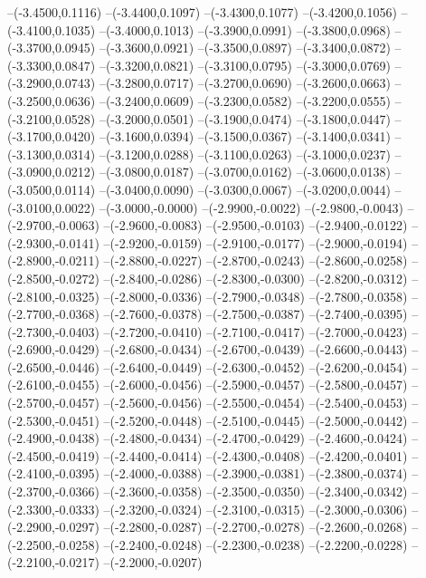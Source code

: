 	--(-3.4500,0.1116)
	--(-3.4400,0.1097)
	--(-3.4300,0.1077)
	--(-3.4200,0.1056)
	--(-3.4100,0.1035)
	--(-3.4000,0.1013)
	--(-3.3900,0.0991)
	--(-3.3800,0.0968)
	--(-3.3700,0.0945)
	--(-3.3600,0.0921)
	--(-3.3500,0.0897)
	--(-3.3400,0.0872)
	--(-3.3300,0.0847)
	--(-3.3200,0.0821)
	--(-3.3100,0.0795)
	--(-3.3000,0.0769)
	--(-3.2900,0.0743)
	--(-3.2800,0.0717)
	--(-3.2700,0.0690)
	--(-3.2600,0.0663)
	--(-3.2500,0.0636)
	--(-3.2400,0.0609)
	--(-3.2300,0.0582)
	--(-3.2200,0.0555)
	--(-3.2100,0.0528)
	--(-3.2000,0.0501)
	--(-3.1900,0.0474)
	--(-3.1800,0.0447)
	--(-3.1700,0.0420)
	--(-3.1600,0.0394)
	--(-3.1500,0.0367)
	--(-3.1400,0.0341)
	--(-3.1300,0.0314)
	--(-3.1200,0.0288)
	--(-3.1100,0.0263)
	--(-3.1000,0.0237)
	--(-3.0900,0.0212)
	--(-3.0800,0.0187)
	--(-3.0700,0.0162)
	--(-3.0600,0.0138)
	--(-3.0500,0.0114)
	--(-3.0400,0.0090)
	--(-3.0300,0.0067)
	--(-3.0200,0.0044)
	--(-3.0100,0.0022)
	--(-3.0000,-0.0000)
	--(-2.9900,-0.0022)
	--(-2.9800,-0.0043)
	--(-2.9700,-0.0063)
	--(-2.9600,-0.0083)
	--(-2.9500,-0.0103)
	--(-2.9400,-0.0122)
	--(-2.9300,-0.0141)
	--(-2.9200,-0.0159)
	--(-2.9100,-0.0177)
	--(-2.9000,-0.0194)
	--(-2.8900,-0.0211)
	--(-2.8800,-0.0227)
	--(-2.8700,-0.0243)
	--(-2.8600,-0.0258)
	--(-2.8500,-0.0272)
	--(-2.8400,-0.0286)
	--(-2.8300,-0.0300)
	--(-2.8200,-0.0312)
	--(-2.8100,-0.0325)
	--(-2.8000,-0.0336)
	--(-2.7900,-0.0348)
	--(-2.7800,-0.0358)
	--(-2.7700,-0.0368)
	--(-2.7600,-0.0378)
	--(-2.7500,-0.0387)
	--(-2.7400,-0.0395)
	--(-2.7300,-0.0403)
	--(-2.7200,-0.0410)
	--(-2.7100,-0.0417)
	--(-2.7000,-0.0423)
	--(-2.6900,-0.0429)
	--(-2.6800,-0.0434)
	--(-2.6700,-0.0439)
	--(-2.6600,-0.0443)
	--(-2.6500,-0.0446)
	--(-2.6400,-0.0449)
	--(-2.6300,-0.0452)
	--(-2.6200,-0.0454)
	--(-2.6100,-0.0455)
	--(-2.6000,-0.0456)
	--(-2.5900,-0.0457)
	--(-2.5800,-0.0457)
	--(-2.5700,-0.0457)
	--(-2.5600,-0.0456)
	--(-2.5500,-0.0454)
	--(-2.5400,-0.0453)
	--(-2.5300,-0.0451)
	--(-2.5200,-0.0448)
	--(-2.5100,-0.0445)
	--(-2.5000,-0.0442)
	--(-2.4900,-0.0438)
	--(-2.4800,-0.0434)
	--(-2.4700,-0.0429)
	--(-2.4600,-0.0424)
	--(-2.4500,-0.0419)
	--(-2.4400,-0.0414)
	--(-2.4300,-0.0408)
	--(-2.4200,-0.0401)
	--(-2.4100,-0.0395)
	--(-2.4000,-0.0388)
	--(-2.3900,-0.0381)
	--(-2.3800,-0.0374)
	--(-2.3700,-0.0366)
	--(-2.3600,-0.0358)
	--(-2.3500,-0.0350)
	--(-2.3400,-0.0342)
	--(-2.3300,-0.0333)
	--(-2.3200,-0.0324)
	--(-2.3100,-0.0315)
	--(-2.3000,-0.0306)
	--(-2.2900,-0.0297)
	--(-2.2800,-0.0287)
	--(-2.2700,-0.0278)
	--(-2.2600,-0.0268)
	--(-2.2500,-0.0258)
	--(-2.2400,-0.0248)
	--(-2.2300,-0.0238)
	--(-2.2200,-0.0228)
	--(-2.2100,-0.0217)
	--(-2.2000,-0.0207)
